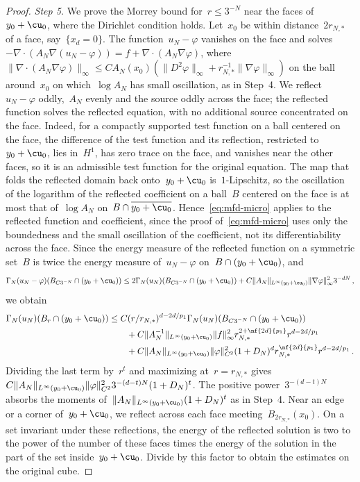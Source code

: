 \documentclass[11pt]{amsart}
\begin{document}
\begin{proof}
\smallskip

\emph{Step 5.} We prove the Morrey bound for~$r\leq3^{-N}$ near the faces of~$y_0+\cu_0$, where the Dirichlet condition holds. Let~$x_0$ be within distance~$2r_{N,*}$ of a face, say~$\{x_d=0\}$. The function~$u_N-\varphi$ vanishes on the face and solves~$-\nabla\cdot(A_N\nabla(u_N-\varphi))=f+\nabla\cdot(A_N\nabla\varphi)$, where~$\|\nabla\cdot(A_N\nabla\varphi)\|_\infty\leq CA_N(x_0)(\|D^2\varphi\|_\infty+r_{N,*}^{-1}\|\nabla\varphi\|_\infty)$ on the ball around~$x_0$ on which~$\log A_N$ has small oscillation, as in Step~4. We reflect~$u_N-\varphi$ oddly,~$A_N$ evenly and the source oddly across the face; the reflected function solves the reflected equation, with no additional source concentrated on the face. Indeed, for a compactly supported test function on a ball centered on the face, the difference of the test function and its reflection, restricted to~$y_0+\cu_0$, lies in~$H^1$, has zero trace on the face, and vanishes near the other faces, so it is an admissible test function for the original equation. The map that folds the reflected domain back onto~$y_0+\cu_0$ is~$1$-Lipschitz, so the oscillation of the logarithm of the reflected coefficient on a ball~$B$ centered on the face is at most that of~$\log A_N$ on~$B\cap\overline{y_0+\cu_0}$. Hence~\eqref{eq:mfd-micro} applies to the reflected function and coefficient, since the proof of~\eqref{eq:mfd-micro} uses only the boundedness and the small oscillation of the coefficient, not its differentiability across the face. Since the energy measure of the reflected function on a symmetric set~$B$ is twice the energy measure of~$u_N-\varphi$ on~$B\cap(y_0+\cu_0)$, and
\begin{equation*}
	\Gamma_N(u_N-\varphi)(B_{C3^{-N}}\cap(y_0+\cu_0))
	\leq2\Gamma_N(u_N)(B_{C3^{-N}}\cap(y_0+\cu_0))
	+C\|A_N\|_{L^\infty(y_0+\cu_0)}\|\nabla\varphi\|_\infty^23^{-dN}\,,
\end{equation*}
we obtain
\begin{align*}
	\Gamma_N(u_N)(B_r\cap(y_0+\cu_0))
	&\leq C(r/r_{N,*})^{d-2d/p_1}\Gamma_N(u_N)(B_{C3^{-N}}\cap(y_0+\cu_0))\notag\\
	&\qquad+C\|A_N^{-1}\|_{L^\infty(y_0+\cu_0)}\|f\|_\infty^2r_{N,*}^{2+\nf{2d}{p_1}}r^{d-2d/p_1}\notag\\
	&\qquad+C\|A_N\|_{L^\infty(y_0+\cu_0)}\|\varphi\|_{C^2}^2(1+D_N)^dr_{N,*}^{\nf{2d}{p_1}}r^{d-2d/p_1}\,.
\end{align*}
Dividing the last term by~$r^t$ and maximizing at~$r=r_{N,*}$ gives~$C\|A_N\|_{L^\infty(y_0+\cu_0)}\|\varphi\|_{C^2}^23^{-(d-t)N}(1+D_N)^t$. The positive power~$3^{-(d-t)N}$ absorbs the moments of~$\|A_N\|_{L^\infty(y_0+\cu_0)}(1+D_N)^t$ as in Step~4. Near an edge or a corner of~$y_0+\cu_0$, we reflect across each face meeting~$B_{2r_{N,*}}(x_0)$. On a set invariant under these reflections, the energy of the reflected solution is two to the power of the number of these faces times the energy of the solution in the part of the set inside~$y_0+\cu_0$. Divide by this factor to obtain the estimates on the original cube.


\end{proof}
\end{document}
